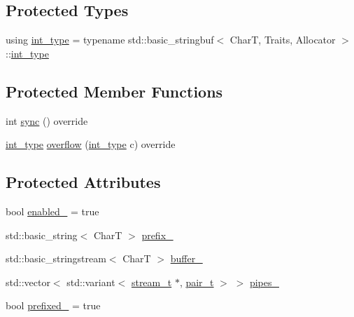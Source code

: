 \subsection*{Protected Types}
\begin{DoxyCompactItemize}
\item 
using \hyperlink{structdevfix_1_1base_1_1strout_ac08d70e3105ac2175c26e34818624826}{int\+\_\+type} = typename std\+::basic\+\_\+stringbuf$<$ CharT, Traits, Allocator $>$\+::\hyperlink{structdevfix_1_1base_1_1strout_ac08d70e3105ac2175c26e34818624826}{int\+\_\+type}
\end{DoxyCompactItemize}
\subsection*{Protected Member Functions}
\begin{DoxyCompactItemize}
\item 
int \hyperlink{structdevfix_1_1base_1_1strout_a50b305dcf9905bfe75fa1bba42718169}{sync} () override
\item 
\hyperlink{structdevfix_1_1base_1_1strout_ac08d70e3105ac2175c26e34818624826}{int\+\_\+type} \hyperlink{structdevfix_1_1base_1_1strout_a1d8ba6e5c7c0c2d5558095d957cc4273}{overflow} (\hyperlink{structdevfix_1_1base_1_1strout_ac08d70e3105ac2175c26e34818624826}{int\+\_\+type} c) override
\end{DoxyCompactItemize}
\subsection*{Protected Attributes}
\begin{DoxyCompactItemize}
\item 
bool \hyperlink{structdevfix_1_1base_1_1strout_a813fc6630d6565cf5a00e620b536671c}{enabled\+\_\+} = true
\item 
std\+::basic\+\_\+string$<$ CharT $>$ \hyperlink{structdevfix_1_1base_1_1strout_a664c76563ab0f7f0625779aaf0c56395}{prefix\+\_\+}
\item 
std\+::basic\+\_\+stringstream$<$ CharT $>$ \hyperlink{structdevfix_1_1base_1_1strout_a0625f5cbd10441a4613bf3aae5ab15a1}{buffer\+\_\+}
\item 
std\+::vector$<$ std\+::variant$<$ \hyperlink{structdevfix_1_1base_1_1strout_a158aadfad348eeac7c56a8b43699a4d3}{stream\+\_\+t} $\ast$, \hyperlink{structdevfix_1_1base_1_1strout_a2212cb8a99abec10490e891cc67820bb}{pair\+\_\+t} $>$ $>$ \hyperlink{structdevfix_1_1base_1_1strout_aa92f98e253e448a0ea897760764486e7}{pipes\+\_\+}
\item 
bool \hyperlink{structdevfix_1_1base_1_1strout_a1e56005b02772de34fddd5e4f44741c3}{prefixed\+\_\+} = true
\end{DoxyCompactItemize}

